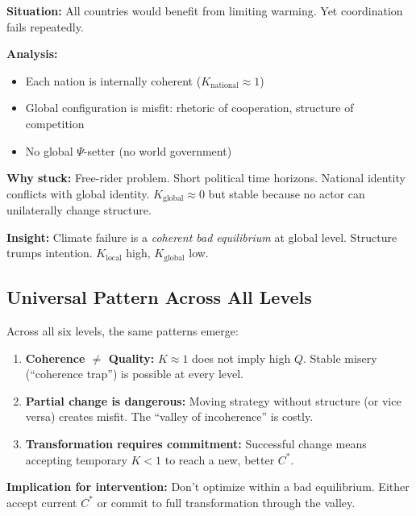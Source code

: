 \begin{tcolorbox}[colback=orange!5!white, colframe=orange!75!black,
    title=\textbf{Worked Example L=6: Global Coordination Failure}]

\textbf{Situation:} All countries would benefit from limiting warming.
Yet coordination fails repeatedly.

\textbf{Analysis:}
\begin{itemize}[nosep]
    \item Each nation is internally coherent ($K_{\text{national}} \approx 1$)
    \item Global configuration is misfit: rhetoric of cooperation, structure of competition
    \item No global $\Psi$-setter (no world government)
\end{itemize}

\textbf{Why stuck:}
Free-rider problem. Short political time horizons. National identity conflicts with global identity.
$K_{\text{global}} \approx 0$ but stable because no actor can unilaterally change structure.

\textbf{Insight:} Climate failure is a \emph{coherent bad equilibrium} at global level.
Structure trumps intention. $K_{\text{local}}$ high, $K_{\text{global}}$ low.

\end{tcolorbox}


\subsection{Universal Pattern Across All Levels}

\begin{tcolorbox}[colback=blue!5!white, colframe=blue!75!black,
    title=\textbf{Integration: The Three Laws of Coherence}]

Across all six levels, the same patterns emerge:

\begin{enumerate}
    \item \textbf{Coherence $\neq$ Quality:} $K \approx 1$ does not imply high $Q$.
          Stable misery (``coherence trap'') is possible at every level.

    \item \textbf{Partial change is dangerous:} Moving strategy without structure
          (or vice versa) creates misfit. The ``valley of incoherence'' is costly.

    \item \textbf{Transformation requires commitment:} Successful change means
          accepting temporary $K < 1$ to reach a new, better $C^*$.
\end{enumerate}

\textbf{Implication for intervention:} Don't optimize within a bad equilibrium.
Either accept current $C^*$ or commit to full transformation through the valley.

\end{tcolorbox}

